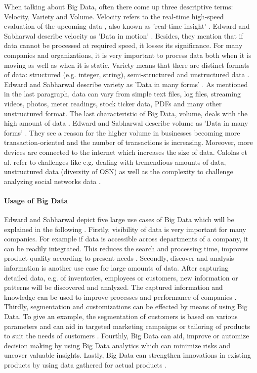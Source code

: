 When talking about Big Data, often there come up three descriptive terms: Velocity, Variety and Volume.
Velocity refers to the real-time high-speed evaluation of the upcoming data \cite{nosql_meier},  also known as 'real-time insight' \cite{mongodb_edward}. Edward and Sabharwal describe velocity as 'Data in motion' \cite[p.7 ff.]{mongodb_edward}. Besides, they mention that if data cannot be processed at required speed, it losses its significance. For many companies and organizations, it is very important to process data both when it is moving as well as when it is static. 
Variety means that there are distinct formats of data: structured (e.g. integer, string), semi-structured and unstructured data \cite{nosql_meier}. Edward and Sabharwal describe variety as 'Data in many forms' \cite[p.7 ff.]{mongodb_edward}. As mentioned in the last paragraph, data can vary from simple text files, log files, streaming videos, photos, meter readings, stock ticker data, PDFs and many other unstructured format.   
The last characteristic of Big Data, volume, deals with the high amount of data \cite{nosql_meier}. Edward and Sabharwal describe volume as 'Data in many forms' \cite[p.7 ff.]{mongodb_edward}. They see a reason for the higher volume in businesses becoming more transaction-oriented and the number of transactions is increasing. Moreover, more devices are connected to the internet which increases the size of data.
Calolas et al. refer to challenges like e.g. dealing with tremendious amounts of data, unstructured data (diversity of \ac{OSN}) as well as the complexity to challenge analyzing social networks data \cites{trends_nosql}.

\paragraph{Usage of Big Data}

Edward and Sabharwal depict five large use cases of Big Data which will be explained in the following \cite[p.9 ff.]{mongodb_edward}. Firstly, visibility of data is very important for many companies. For example if data is accessible across departments of a company, it can be readily integrated. This reduces the search and processing time, improves product quality according to present needs \cite[p.9 ff.]{mongodb_edward}. Secondly, discover and analysis information is another use case for large amounts of data. After capturing detailed data, e.g. of inventories, employees or customers, new information or patterns will be discovered and analyzed. The captured information and knowledge can be used to improve processes and performance of companies \cite[p.9 ff.]{mongodb_edward}. Thirdly, segmentation and customizations can be effected by means of using Big Data. To give an example, the segmentation of customers is based on various parameters and can aid in targeted marketing campaigns or tailoring of products to suit the needs of customers \cite[p.9 ff.]{mongodb_edward}. Fourthly, Big Data can aid, improve or automize decision making by using Big Data analytics which can minimize risks and uncover valuable insights. Lastly, Big Data can strengthen innovations in existing products by using data gathered for actual products \cite[p.9 ff.]{mongodb_edward}.    

